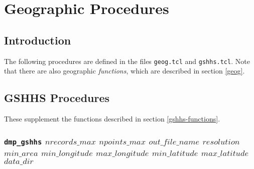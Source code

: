 
\section{Geographic Procedures}
    \label{geog-proc}

\subsection{Introduction}
    \label{geog-proc-Introduction}

The following procedures are defined in the files \texttt{geog.tcl} and \texttt{gshhs.tcl}. 
Note that there are also geographic \emph{functions}, which are described in section \ref{geog}.

\subsection{GSHHS Procedures}
    \label{geog-proc-gshhs}

These supplement the functions described in section \ref{gshhs-functions}.

\subsubsection{\texttt{dmp\_gshhs}
	$\mathit{nrecords\_max}$
	$\mathit{npoints\_max}$
	$\mathit{out\_file\_name}$
	$\mathit{resolution}$
	$\mathit{min\_area}$
	$\mathit{min\_longitude}$
	$\mathit{max\_longitude}$
	$\mathit{min\_latitude}$
	$\mathit{max\_latitude}$
	$\mathit{data\_dir}$
}
    \label{geog-proc-dmp-gshhs}

